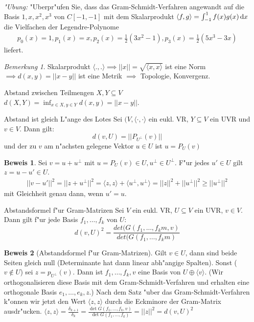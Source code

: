 \documentclass[oneside,fontsize=11pt,paper=a4,BCOR=0mm,DIV=12,automark,headsepline]{scrbook}
\theoremstyle{remark}
\theoremstyle{definition}
\theoremstyle{definition}
\newtheorem*{prof}{Beweis}
\theoremstyle{remark}
\newtheorem*{bem}{Bemerkung}
\begin{document}
\emph{"Ubung:} "Uberpr"ufen Sie, dass das Gram-Schmidt-Verfahren angewandt auf die Basis \(1, x, x^2, x^3\) von \(C[-1, -1]\) mit dem Skalarprodukt \(\langle f, g\rangle = \int_{-1}^1f(x)g(x)\dif x\) die Vielfachen der Legendre-Polynome
\begin{align*}
  p_0(x) = 1, p_1(x) = x, p_2(x) = \frac{1}{2}(3x^2 - 1), p_3(x) = \frac{1}{2}(5x^3 - 3x)
\end{align*}
liefert.

\begin{bem}
  Skalarprodukt \(\langle . , .\rangle \implies ||x|| = \sqrt{\langle x, x\rangle}\) ist eine Norm \(\implies d(x, y) = ||x-y||\) ist eine Metrik \(\implies\) Topologie, Konvergenz.
\end{bem}

\begin{definition}{Abstand zwischen Teilmengen $X,Y \subseteq V$}{}
  $d(X,Y)= \inf_{x\in X, y\in Y} d(x,y)=||x-y||$.
\end{definition}

\begin{satz}{Abstand ist gleich L"ange des Lotes}
  Sei $(V, \langle {\cdot, \cdot} \rangle$ ein eukl. VR, $Y\subseteq V$ ein UVR
  und $v\in V$. Dann gilt: \[d(v, U) = ||P_{U^\perp}(v)||\] und der zu $v$ am
  n"achsten gelegene Vektor $u\in U$ ist $u=P_U(v)$
\end{satz}



\begin{prof}
  Sei \(v = u + u^\perp\) mit \(u = P_U(v) \in U, u^\perp \in U^\perp\). F"ur jedes \(u' \in U\) gilt \(z = u - u' \in U\).
  \begin{align*}
    ||v - u'||^2 = ||z + u^\perp||^2 = \langle z, z\rangle + \langle u^\perp , u^\perp\rangle = ||z||^2 + ||u^\perp||^2 \geq ||u^\perp||^2
  \end{align*}
  mit Gleichheit genau dann, wenn \(u' = u\).
\end{prof}

\begin{satz}{Abstandsformel f"ur Gram-Matrizen}
  Sei $V$ ein eukl. VR, $U\subseteq V$ ein UVR, $v\in V$. Dann gilt f"ur jede
  Basis $f_1, \ldots, f_k$ von $U$: \[d(v,U)^2 = \frac{det(G(f_1, \ldots, f_km, v)}{det(G(f_1, \ldots, f_km)}\]
\end{satz}

\begin{prof}[Abstandsformel f"ur Gram-Matrizen]
  Gilt \(v\in U\), dann sind beide Seiten gleich null (Determinante hat dann linear abh"angige Spalten). Sonst (\(v \not\in U\)) sei \(z = p_{U^\perp}(v)\). Dann ist \(f_1, \dots, f_k, v\) eine Basis von \(U\oplus \langle v\rangle\). (Wir orthogonalisieren diese Basis mit dem Gram-Schmidt-Verfahren und erhalten eine orthogonale Basis \(e_1, \dots, e_k, z\).) Nach dem Satz "uber das Gram-Schmidt-Verfahren k"onnen wir jetzt den Wert \(\langle z, z\rangle\) durch die Eckminore der Gram-Matrix ausdr"ucken. \(\langle z,z\rangle = \frac{\delta_{k+1}}{\delta_k} = \frac{\det G(f_1,\dots, f_k, v)}{\det G(f_1, \dots, f_k)} = ||z||^2 = d(v, U)^2\)
\end{prof}
\end{document}

